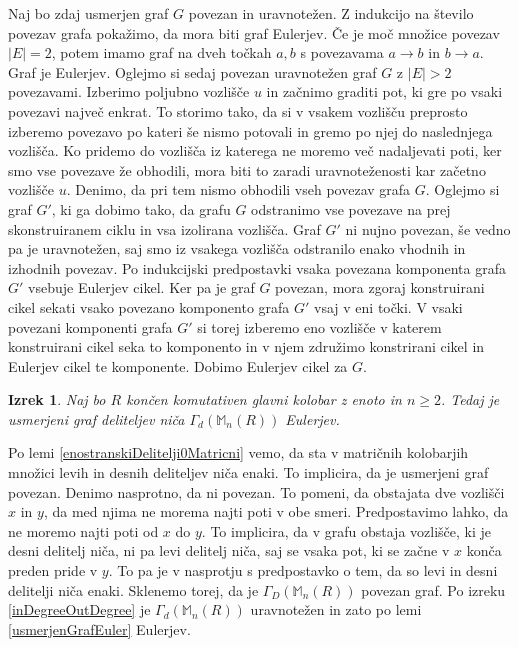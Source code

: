 \documentclass[a4paper, 12pt]{amsart}
\theoremstyle{definition} %
\theoremstyle{plain} %
\newtheorem{izrek}[definicija]{Izrek}
\newcommand{\M}{\mathbb M}
\begin{document}
Naj bo zdaj usmerjen graf $G$ povezan in uravnotežen. Z indukcijo na število povezav grafa pokažimo, da mora biti graf Eulerjev. Če je moč množice povezav $|E|=2$, potem imamo graf na dveh točkah $a,b$ s povezavama $a\rightarrow b$ in $b\rightarrow a$. Graf je Eulerjev. Oglejmo si sedaj povezan uravnotežen graf $G$ z $|E|> 2$ povezavami. Izberimo poljubno vozlišče $u$ in začnimo graditi pot, ki gre po vsaki povezavi največ enkrat. To storimo tako, da si v vsakem vozlišču preprosto izberemo povezavo po kateri še nismo potovali in gremo po njej do naslednjega vozlišča. Ko pridemo do vozlišča iz katerega ne moremo več nadaljevati poti, ker smo vse povezave že obhodili, mora biti to zaradi uravnoteženosti kar začetno vozlišče $u$. Denimo, da pri tem nismo obhodili vseh povezav grafa $G$. Oglejmo si graf $G'$, ki ga dobimo tako, da grafu $G$ odstranimo vse povezave na prej skonstruiranem ciklu in vsa izolirana vozlišča. Graf $G'$ ni nujno povezan, še vedno pa je uravnotežen, saj smo iz vsakega vozlišča odstranilo enako vhodnih in izhodnih povezav. Po indukcijski predpostavki vsaka povezana komponenta grafa $G'$ vsebuje Eulerjev cikel. Ker pa je graf $G$ povezan, mora zgoraj konstruirani cikel sekati vsako povezano komponento grafa $G'$ vsaj v eni točki. V vsaki povezani komponenti grafa $G'$ si torej izberemo eno vozlišče v katerem konstruirani cikel seka to komponento in v njem združimo konstrirani cikel in Eulerjev cikel te komponente. Dobimo Eulerjev cikel za $G$.
\endproof

\begin{izrek}
Naj bo $R$ končen komutativen glavni kolobar z enoto in $n\ge 2$. Tedaj je usmerjeni graf deliteljev niča $\Gamma_d(\M_n(R))$ Eulerjev.
\end{izrek}

\proof
Po lemi \ref{enostranskiDelitelji0Matricni} vemo, da sta v matričnih kolobarjih množici levih  in desnih deliteljev niča enaki. To implicira, da je usmerjeni graf povezan. Denimo nasprotno, da ni povezan. To pomeni, da obstajata dve vozlišči $x$ in $y$, da med njima ne morema najti poti v obe smeri. Predpostavimo lahko, da ne moremo najti poti od $x$ do $y$. To implicira, da v grafu obstaja vozlišče, ki je desni delitelj niča, ni pa levi delitelj niča, saj se vsaka pot, ki se začne v $x$ konča preden pride v $y$. To pa je v nasprotju s predpostavko o tem, da so levi in desni delitelji niča enaki. Sklenemo torej, da je $\Gamma_D(\M_n(R))$ povezan graf. Po izreku \ref{inDegreeOutDegree} je $\Gamma_d(\M_n(R))$ uravnotežen in zato po lemi \ref{usmerjenGrafEuler} Eulerjev.
\endproof
\end{document}
